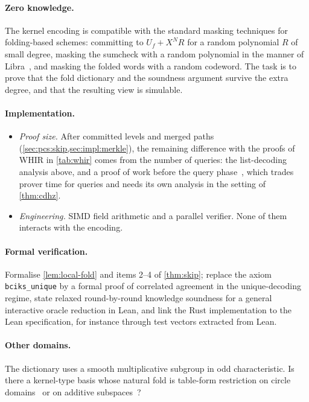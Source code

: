 \paragraph{Zero knowledge.}
The kernel encoding is compatible with the standard masking techniques for folding-based schemes: committing to $U_f + X^N R$ for a random polynomial $R$ of small degree, masking the sumcheck with a random polynomial in the manner of Libra~\cite{XZZPS19}, and masking the folded words with a random codeword. The task is to prove that the fold dictionary and the soundness argument survive the extra degree, and that the resulting view is simulable.

\paragraph{Implementation.}
\begin{itemize}
  \item \emph{Proof size.} After committed levels and merged paths (\cref{sec:pcs:skip,sec:impl:merkle}), the remaining difference with the proofs of WHIR in \cref{tab:whir} comes from the number of queries: the list-decoding analysis above, and a proof of work before the query phase~\cite{ACFY24}, which trades prover time for queries and needs its own analysis in the setting of \cref{thm:cdhz}.
  \item \emph{Engineering.} SIMD field arithmetic and a parallel verifier. None of them interacts with the encoding.
\end{itemize}

\paragraph{Formal verification.}
Formalise \cref{lem:local-fold} and items 2--4 of \cref{thm:skip}; replace the axiom \texttt{bciks\_unique} by a formal proof of correlated agreement in the unique-decoding regime, state relaxed round-by-round knowledge soundness for a general interactive oracle reduction in Lean, and link the Rust implementation to the Lean specification, for instance through test vectors extracted from Lean.

\paragraph{Other domains.}
The dictionary uses a smooth multiplicative subgroup in odd characteristic. Is there a kernel-type basis whose natural fold is table-form restriction on circle domains~\cite{HLP24} or on additive subspaces~\cite{LCH14,DP24}?

